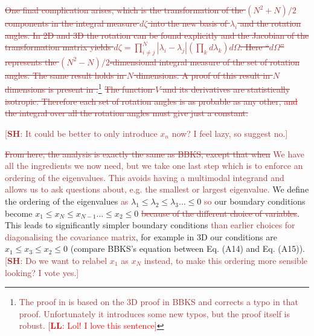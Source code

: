 \documentclass[12pt]{article}
\newcommand{\lfl}[1]{\textcolor{red}{[{\bf LL}: #1]}}
\newcommand{\SH}[1]{\textcolor{brown}{[{\bf SH}: #1]}}
\newcommand{\sh}[1]{\textcolor{brown}{#1}}
\newcommand{\LFL}[1]{\textcolor{red}{#1}}
\begin{document}
\sh{\sout{One final complication arises, which is the transformation of the $(N^2+N)/2$ components in the integral measure $d\zeta$ into the new basis of $\lambda_i$ and the rotation angles. In 2D and 3D the rotation can be found explicitly and the Jacobian of the transformation matrix yields $d \zeta = \prod_{i \neq j}^N |\lambda_i - \lambda_j|(\prod_k d\lambda_k) d \Omega$. Here ``$d\Omega$'' represents the $(N^2-N)/2$-dimensional integral measure of the set of rotation angles. The same result holds in $N$ dimensions. A proof of this result in $N$ dimensions is present in \cite{Easther2016}.}\footnote{\sh{The proof in \cite{Easther2016} is based on the 3D proof in BBKS and corrects a typo in that proof. Unfortunately it introduces some new typos, but the proof itself is robust. \lfl{Lol! I love this sentence}}} \sout{The function $V$ and its derivatives are statistically isotropic. Therefore each set of rotation angles is as probable as any other, \LFL{and} the integral over all the rotation angles must give just a constant.}}



\SH{It could be better to only introduce $x_n$ now? I feel lazy, so suggest no.}

\sh{\sout{From here, the analysis is exactly the same as BBKS, except that when} We have all the ingredients we now need, but we take one last step which is to enforce an ordering of the eigenvalues. This avoids having a multimodal integrand and allows us to ask questions about, e.g. the smallest or largest eigenvalue.} We define the ordering of the eigenvalues \sh{as} $\lambda_1 \leq \lambda_2 \leq \lambda_3 \ldots \leq 0$ \sh{so} our boundary conditions become $x_1\leq x_N\leq x_{N-1} ... \leq x_2 \leq 0$ \sh{\sout{because of the different choice of \sh{variables}}}. This leads to significantly simpler boundary conditions \sh{than earlier choices for diagonalising the covariance matrix}, for example in 3D our conditions are $x_1\leq x_3 \leq x_2 \leq 0$ (compare BBKS's equation between Eq. (A14) and Eq. (A15)).\SH{Do we want to relabel $x_1$ as $x_N$ instead, to make this ordering more sensible looking? I vote yes.}
\end{document}
